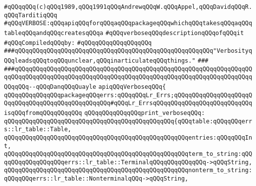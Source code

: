 \label{src/app/yacc/src/verbose.api}
\verb|#qQQqqQQq(c)qQQq1989,qQQq1991qQQqAndrewqQQqW.qQQqAppel,qQQqDavidqQQqR.qQQqTarditiqQQq|\newline
\verb|#qQQqVERBOSE:qQQqapiqQQqforqQQqaqQQqpackageqQQqwhichqQQqtakesqQQqaqQQqtableqQQqandqQQqcreatesqQQqa|\newline
\verb|#qQQqverboseqQQqdescriptionqQQqofqQQqit|\newline
\newline
\verb|#qQQqCompiledqQQqby:|\newline
\verb|#qQQqqQQqqQQqqQQqqQQq|\newline
\newline
\newline
\newline
\verb|###qQQqqQQqqQQqqQQqqQQqqQQqqQQqqQQqqQQqqQQqqQQqqQQqqQQqqQQq"VerbosityqQQqleadsqQQqtoqQQqunclear,qQQqinarticulateqQQqthings."|\newline
\verb|###|\newline
\verb|###qQQqqQQqqQQqqQQqqQQqqQQqqQQqqQQqqQQqqQQqqQQqqQQqqQQqqQQqqQQqqQQqqQQqqQQqqQQqqQQqqQQqqQQqqQQqqQQqqQQqqQQqqQQqqQQqqQQqqQQqqQQqqQQqqQQqqQQqqQQqqQQq--qQQqDanqQQqQuayle|\newline
\newline
\newline
\newline
\verb|apiqQQqVerboseqQQq{|\newline
\newline
\verb|qQQqqQQqqQQqqQQqpackageqQQqerrs:qQQqqQQqLr_Errs;qQQqqQQqqQQqqQQqqQQqqQQqqQQqqQQqqQQqqQQqqQQqqQQqqQQq#qQQqLr_ErrsqQQqqQQqqQQqqQQqqQQqqQQqqQQqisqQQqfromqQQqqQQqqQQq|\newline
\newline
\verb|qQQqqQQqqQQqqQQqprint_verboseqQQq:|\newline
\verb|qQQqqQQqqQQqqQQqqQQqqQQqqQQqqQQqqQQqqQQqqQQqqQQq{qQQqtable:qQQqqQQqerrs::lr_table::Table,|\newline
\verb|qQQqqQQqqQQqqQQqqQQqqQQqqQQqqQQqqQQqqQQqqQQqqQQqqQQqentries:qQQqqQQqInt,|\newline
\verb|qQQqqQQqqQQqqQQqqQQqqQQqqQQqqQQqqQQqqQQqqQQqqQQqqQQqterm_to_string:qQQqqQQqqQQqqQQqqQQqerrs::lr_table::TerminalqQQqqQQqqQQqqQQq->qQQqString,|\newline
\verb|qQQqqQQqqQQqqQQqqQQqqQQqqQQqqQQqqQQqqQQqqQQqqQQqqQQqnonterm_to_string:qQQqqQQqerrs::lr_table::NonterminalqQQq->qQQqString,|\newline
